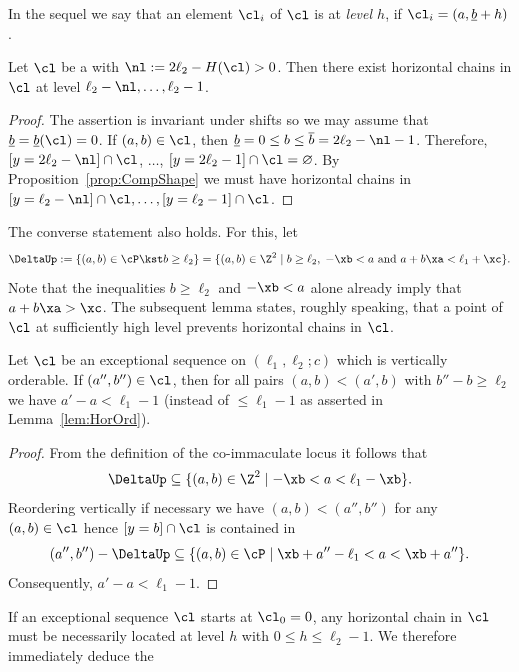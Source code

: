 {In the sequel we say that an element $\cl_i$ 
of $\cl$ is at {\em level $h$}, if $\cl_i=(a,\underline b+h)$.}

\begin{coro}
\label{coro:ExHorChains}
Let $\cl$ be a {\mes} with 
$\nl:=2\ell_2-H(\cl)>0$. 
Then there {exist} 
horizontal chains in $\cl$ at level 
$\ell_2-\nl,\ldots,\ell_2-1$. 
\end{coro}

\begin{proof}
{The assertion is invariant under shifts 
so we may assume that $\underline b=\underline b(\cl)=0$. If 
$(a,b)\in\cl$, then $\underline b=0\leq b\leq\overline b=
2\ell_2-\nl-1$. Therefore,  
$[y=2\ell_2-\nl]\cap\cl$, $\ldots$, $[y=2\ell_2-1]
\cap\cl=\varnothing$. By 
Proposition~\ref{prop:CompShape} we must have 
horizontal chains in $[y=\ell_2-\nl]\cap\cl,
\ldots,[y=\ell_2-1]\cap\cl$.}
\end{proof}

The converse statement also holds.
For this, let
$$
\DeltaUp:=\{(a,b)\in\cP\kst b\geq\ell_2\}
=\{(a,b)\in\Z^2\mid b\geq\ell_2,\; -\xb<a
\mbox{ and }a+b\xa<\ell_1+\xc\}.
$$
Note that the inequalities $b\geq\ell_2$ 
and $-\xb<a$ alone already imply that 
$a+b\xa>\xc$. The subsequent lemma states, 
roughly speaking, that a point of $\cl$ 
at sufficiently high level prevents horizontal 
chains in $\cl$.

\begin{lemma}
\label{lem:HeightConstraint}
Let $\cl$ be an exceptional sequence 
on $(\ell_1,\ell_2;c)$ which is
vertically orderable. If $(a'',b'')\in\cl$, 
then for all pairs $(a,b)<(a',b)$ 
with $b''-b\geq\ell_2$ we have 
$a'-a<\ell_1-1$ (instead of $\leq\ell_1-1$
as asserted in Lemma~\ref{lem:HorOrd}).
\end{lemma}

\begin{proof}
From the definition of the {co-immaculate} 
locus it follows that 
$$
\DeltaUp\subseteq\{(a,b)\in\Z^2\mid-\xb
<a<\ell_1-\xb\}.
$$
Reordering vertically if necessary 
we have $(a,b)<(a'',b'')$ for any 
$(a,b)\in\cl$ hence $[y=b]\cap\cl$ 
is contained in
$$
(a'',b'')-\DeltaUp\subseteq\{(a,b)\in
\cP\mid\xb+a''-\ell_1<a<\xb+a''\}.
$$
Consequently, $a'-a<\ell_1-1$.
\end{proof}

If an exceptional sequence $\cl$ 
starts at $\cl_0=0$, any horizontal chain 
in $\cl$ must be necessarily located at 
level $h$ with $0\leq h\leq\ell_2-1$. 
We therefore immediately deduce the

